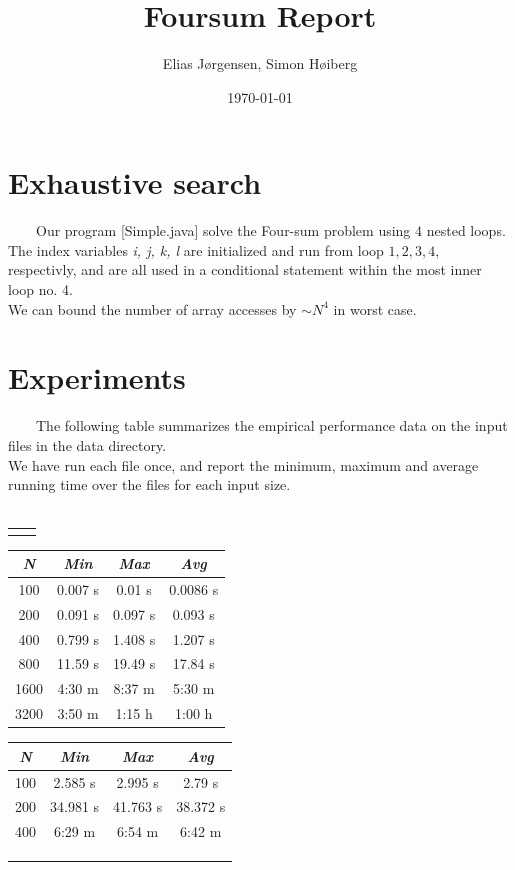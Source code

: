 \documentclass[a4paper,11pt]{article}
\title{Foursum Report}
\author{Elias Jørgensen, Simon Høiberg}
\date{\today}
\begin{document}
\maketitle

\section*{Exhaustive search}

\ \ \ \
Our program [Simple.java] solve the Four-sum problem using $ 4 $ nested loops. \\
The index variables \textit{i, j, k, l} are initialized and run from loop $ 1, 2, 3, 4 $,
respectivly, and are all used in a conditional statement within the most inner loop no. 4. \\
We can bound the number of array accesses by $\sim N^4 $ in worst case.

\section*{Experiments}

\ \ \ \
The following table summarizes the empirical performance data on the input files in the data directory.\\
We have run each file once, and report the minimum, maximum and average running time over the files
for each input size. \\
\hspace{5mm}\\

\begin{tabular}{p{6.4cm}p{6.3cm}}
\centering{\textbf{Simple Java}} & \centering{\textbf{Simple Python}}
\end{tabular}

{
\centering
\def\arraystretch{1.5}
\begin{tabular}{cccc}
\hline
\textit{N} & \textit{Min} & \textit{Max} & \textit{Avg} \\
\hline
100 & 0.007 s & 0.01 s & 0.0086 s \\
200 & 0.091 s & 0.097 s & 0.093 s \\
400 & 0.799 s & 1.408 s & 1.207 s \\
800 & 11.59 s & 19.49 s & 17.84 s \\
1600 & 4:30 m & 8:37 m & 5:30 m \\
3200 & 3:50 m & 1:15 h & 1:00 h \\
\hline
\end{tabular}
\quad
\def\arraystretch{1.5}
\begin{tabular}{cccc}
\hline
\textit{N} & \textit{Min} & \textit{Max} & \textit{Avg} \\
\hline
100 & 2.585 s & 2.995 s & 2.79 s \\
200 & 34.981 s & 41.763 s & 38.372 s \\
400 & 6:29 m & 6:54 m & 6:42 m \\
\hline
\\
\\
\\
\end{tabular}\\
}
\end{document}
